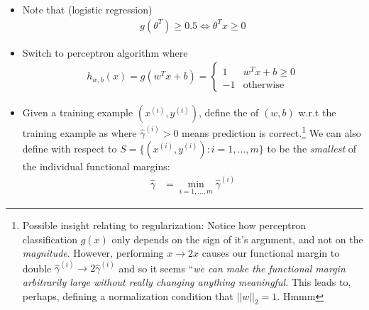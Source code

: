 \documentclass[12pt]{article}
\newcommand{\myspace}{\vspace{2\bigskipamount}}
\begin{document}


\begin{itemize}
	\item Note that (logistic regression) 
	\begin{align}
	g(\theta^T) \ge 0.5 \iff \theta^Tx \ge 0
	\end{align}
	\item Switch to perceptron algorithm where 
	\begin{align}
	h_{w, b}(x) = g(w^T x + b) = 
	\begin{cases}
	1 &  w^Tx + b \ge 0 \\
	-1 & \text{otherwise} 
	\end{cases}
	\label{perceptron}
	\end{align}
	\item Given a training example $(x^{(i)}, y^{(i)})$, define the  of $(w,b)$ w.r.t the training example as 
	where $\hat{\gamma}^{(i)} > 0$ means prediction is correct.\footnote{Possible insight relating to regularization: Notice how perceptron classification $g(x)$ only depends on the sign of it's argument, and not on the \textit{magnitude}. However, performing $x \rightarrow 2x$ causes our functional margin to double $\hat{\gamma}^{(i)} \rightarrow 2 \hat{\gamma}^{(i)}$ and so it seems ``\textit{we can make the functional margin arbitrarily large without really changing anything meaningful.} This leads to, perhaps, defining a normalization condition that $||w||_2 = 1$. Hmmm\textellipsis} We can also define with respect to $S = \{(x^{(i)}, y^{(i)}) : i = 1,\ldots,m \}$ to be the \textit{smallest} of the individual functional margins:
	\begin{align}
	\hat{\gamma} &= \min_{i=1,\ldots,m} \hat{\gamma}^{(i)}
	\end{align}
	\myspace
	

\end{itemize}
\end{document}
